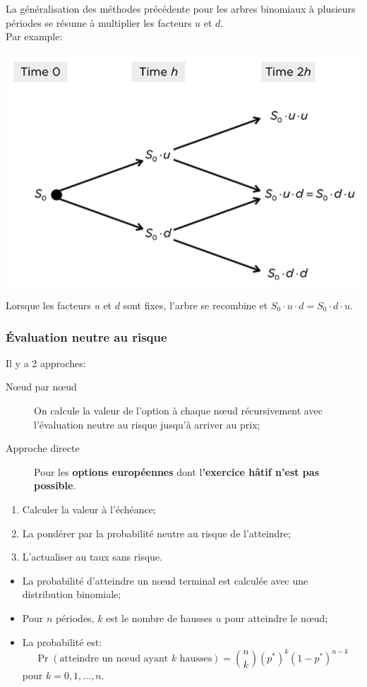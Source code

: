 \documentclass[10pt, french]{article}
\begin{document}
\begin{multicols*}{2}
La généralisation des méthodes précédente pour les arbres binomiaux à plusieurs périodes se résume à multiplier les facteurs $u$ et $d$. \\
Par example:
\begin{center}
	\includegraphics[scale=0.33]{../../src/ACT-2011/mult-per-bin-tree.png}
\end{center}

Lorsque les facteurs $u$ et $d$ sont fixes, l'arbre se recombine et $S_{0} \cdot u \cdot d = S_{0} \cdot d \cdot u$.

\subsubsection*{Évaluation neutre au risque}

Il y a 2 approches:
\begin{description}
	\item[Nœud par nœud]	On calcule la valeur de l'option à chaque nœud récursivement avec l'évaluation neutre au risque jusqu'à arriver au prix;
	\item[Approche directe]	Pour les \textbf{options européennes} dont l\textbf{'exercice hâtif n'est pas possible}.
\end{description}

\begin{algo2}
\begin{enumerate}[label	=	\circled{\arabic*}{trueblue}]
	\item	Calculer la valeur à l'échéance;
	\item	La pondérer par la probabilité neutre au risque de l'atteindre;
	\item	L'actualiser au taux sans risque.
\end{enumerate}
\tcbline
\begin{itemize}
	\item	La probabilité d'atteindre un nœud terminal est calculée avec une distribution binomiale;
	\item	Pour $n$ périodes, $k$ est le nombre de hausses $u$ pour atteindre le nœud;
	\item	La probabilité est: \[\Pr(\text{atteindre un nœud ayant $k$ hausses})	=	\binom{n}{k} (p^{*})^{k} (1 - p^{*})^{n - k}\] pour $k = 0, 1, \dots, n$.
\end{itemize}
\end{algo2}


\end{multicols*}
\end{document}
